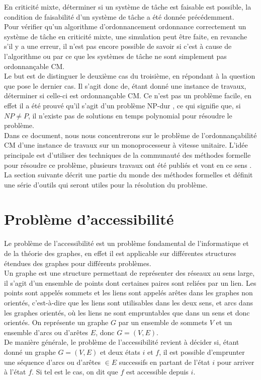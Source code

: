 \documentclass[a4paper]{report}
\theoremstyle{break}
\theoremstyle{breakplain}
\begin{document}
En criticité mixte, déterminer si un système de tâche est faisable est possible, la condition de faisabilité d'un système de tâche a été donnée précédemment.\\

Pour vérifier qu'un algorithme d'ordonnancement ordonnance correctement un système de tâche en criticité mixte, une simulation peut être faite, en revanche s'il y a une erreur, il n'est pas encore possible de savoir si c'est à cause de l'algorithme ou par ce que les systèmes de tâche ne sont simplement pas ordonnançable CM.\\

Le but est de distinguer le deuxième cas du troisième, en répondant à la question que pose le dernier cas. Il s'agit donc de, étant donné une instance de travaux, déterminer si celle-ci est ordonnançable CM. Ce n'est pas un problème facile, en effet il a été prouvé qu'il s'agit d'un problème NP-dur \cite{baruah2009mixed}, ce qui signifie que, si $NP \neq P$, il n'existe pas de solutions en temps polynomial pour résoudre le problème.\\

Dans ce document, nous nous concentrerons sur le problème de l'ordonnançabilité CM d'une instance de travaux sur un monoprocesseur à vitesse unitaire. L'idée principale est d'utiliser des techniques de la communauté des méthodes formelle pour résoudre ce problème, plusieurs travaux ont été publiés et vont en ce sens \cite{geeraerts2013multiprocessor} \cite{bakerbrute}. La section suivante décrit une partie du monde des méthodes formelles et définit une série d'outils qui seront utiles pour la résolution du problème.

\section{Problème d'accessibilité}
Le problème de l'accessibilité est un problème fondamental de l'informatique et de la théorie des graphes, en effet il est applicable sur différentes structures étendues des graphes pour différents problèmes.\\
Un graphe est une structure permettant de représenter des réseaux au sens large, il s'agit d'un ensemble de points dont certaines paires sont reliées par un lien. Les points sont appelés sommets et les liens sont appelés arêtes dans les graphes non orientés, c'est-à-dire que les liens sont utilisables dans les deux sens, et arcs dans les graphes orientés, où les liens ne sont empruntables que dans un sens et donc orientés. On représente un graphe $G$ par un ensemble de sommets $V$ et un ensemble d'arcs ou d'arêtes $E$, donc $G = (V, E)$.\\
De manière générale, le problème de l'accessibilité revient à décider si, étant donné un graphe $G = (V, E)$ et deux états $i$ et $f$, il est possible d'emprunter une séquence d'arcs ou d'arêtes $\in E$ successifs en partant de l'état $i$ pour arriver à l'état $f$. Si tel est le cas, on dit que $f$ est accessible depuis $i$.\\
\end{document}

